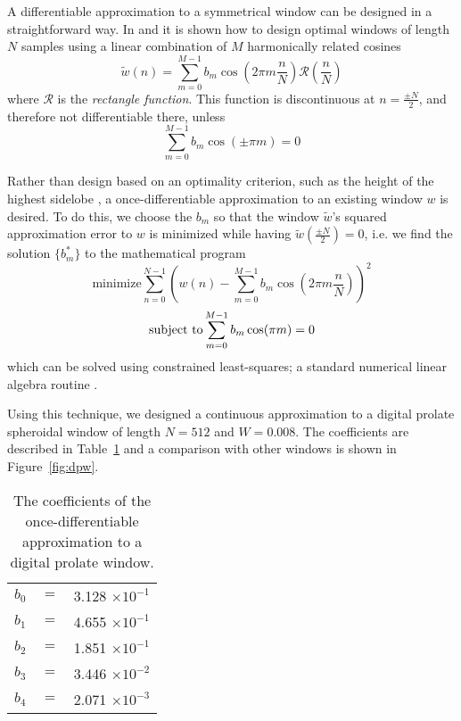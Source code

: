 \documentclass[plainsections,landscape]{sciposter}
\begin{document}
\begin{multicols}{5}
A differentiable approximation to a symmetrical window can be designed in a
straightforward way. In \cite{harris1978use} and \cite{rabiner1970approach} it
is shown how to design optimal windows of length $N$ samples using a linear
combination of $M$ harmonically related cosines
\begin{equation}
    \tilde{w}(n) = \sum_{m=0}^{M-1} b_{m} \cos (2 \pi m \frac{n}{N})
\mathcal{R}(\frac{n}{N})
\end{equation}
where $\mathcal{R}$ is the \textit{rectangle function}. This function is
discontinuous
at $n = \frac{\pm N}{2}$, and therefore not differentiable there, unless
\begin{equation}
\sum_{m=0}^{M-1} b_{m} \cos ( \pm \pi m ) = 0
\end{equation}

Rather than design based on an optimality criterion, such as the height of the
highest sidelobe \cite{rabiner1970approach}, a once-differentiable approximation
to an existing window $w$ is desired. To do this, we choose the $b_{m}$ so that
the window $\tilde{w}$'s squared approximation error to $w$ is minimized while having
$\tilde{w}(\frac{\pm N}{2}) = 0$, i.e. we find the solution $\{ b^{\ast}_{m} \}$ to the
mathematical program
\begin{equation}
    \label{eq:searchcontwinprogram}
    \text{minimize}
    \sum_{n=0}^{N-1} ( w(n) 
        - \sum_{m=0}^{M-1} b_{m} \cos(2 \pi m \frac{n}{N}))^{2}
\end{equation}
\begin{equation}
    \text{subject to} \\
    \sum_{m=0}^{M-1} b_{m} \cos(\pi m ) = 0
\end{equation}
which can be solved using constrained least-squares; a standard numerical
linear algebra routine \cite[p.~585]{golub1996matrix}.

Using this technique, we designed a continuous approximation to a digital prolate
spheroidal window of length $N=512$ and $W=0.008$. The coefficients
are described in Table~\ref{tab:contprolate} and a comparison with other
windows is shown in Figure~\ref{fig:dpw}.

\begin{table}[]
    \caption{The coefficients of the once-differentiable approximation to a digital prolate
    window.
    \label{tab:contprolate}}
    \begin{center}
        \begin{tabular}{c c c}
            $b_0$ & $ = $ & 3.128 $\times 10^{-1}$ \\
            $b_1$ & $ = $ & 4.655 $\times 10^{-1}$ \\
            $b_2$ & $ = $ & 1.851 $\times 10^{-1}$ \\
            $b_3$ & $ = $ & 3.446 $\times 10^{-2}$ \\
            $b_4$ & $ = $ & 2.071 $\times 10^{-3}$ 
        \end{tabular}
    \end{center}
\end{table}%


\end{multicols}
\end{document}
